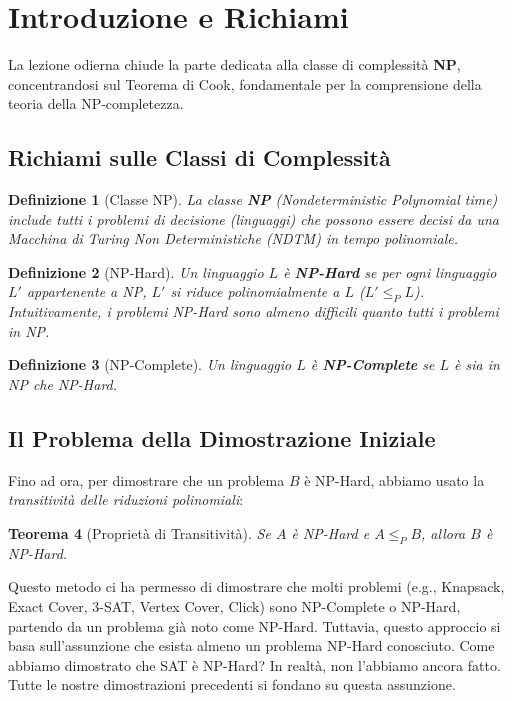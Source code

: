 \documentclass[a4paper, 11pt]{book} %
\newtheorem{theorem}{Teorema}[section]
\newtheorem{definition}[theorem]{Definizione}
\theoremstyle{definition}
\begin{document}
\section{Introduzione e Richiami}

La lezione odierna chiude la parte dedicata alla classe di complessità \textbf{NP}, concentrandosi sul Teorema di Cook, fondamentale per la comprensione della teoria della NP-completezza.

\subsection{Richiami sulle Classi di Complessità}

\begin{definition}[Classe NP]
La classe \textbf{NP} (Nondeterministic Polynomial time) include tutti i problemi di decisione (linguaggi) che possono essere decisi da una \emph{Macchina di Turing Non Deterministiche (NDTM)} in tempo polinomiale.
\end{definition}

\begin{definition}[NP-Hard]
Un linguaggio $L$ è \textbf{NP-Hard} se per ogni linguaggio $L'$ appartenente a NP, $L'$ si riduce polinomialmente a $L$ ($L' \le_P L$). Intuitivamente, i problemi NP-Hard sono \textit{almeno difficili quanto} tutti i problemi in NP.
\end{definition}

\begin{definition}[NP-Complete]
Un linguaggio $L$ è \textbf{NP-Complete} se $L$ è sia in NP che NP-Hard.
\end{definition}

\subsection{Il Problema della Dimostrazione Iniziale}
Fino ad ora, per dimostrare che un problema $B$ è NP-Hard, abbiamo usato la \emph{transitività delle riduzioni polinomiali}:
\begin{theorem}[Proprietà di Transitività]
Se $A$ è NP-Hard e $A \le_P B$, allora $B$ è NP-Hard.
\end{theorem}
Questo metodo ci ha permesso di dimostrare che molti problemi (e.g., Knapsack, Exact Cover, 3-SAT, Vertex Cover, Click) sono NP-Complete o NP-Hard, partendo da un problema già noto come NP-Hard.
Tuttavia, questo approccio si basa sull'assunzione che esista almeno un problema NP-Hard conosciuto. Come abbiamo dimostrato che SAT è NP-Hard? In realtà, non l'abbiamo ancora fatto. Tutte le nostre dimostrazioni precedenti si fondano su questa assunzione.
\end{document}
